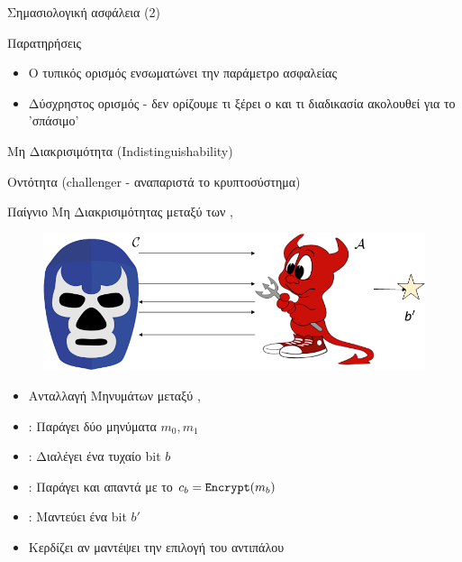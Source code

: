 \documentclass[handout]{beamer}
\begin{document}
\begin{frame}{Σημασιολογική ασφάλεια (2)}
\begin{block}{Παρατηρήσεις}
\begin{itemize}
\item Ο τυπικός ορισμός ενσωματώνει την παράμετρο ασφαλείας
\item Δύσχρηστος ορισμός - δεν ορίζουμε τι ξέρει ο \adv και τι διαδικασία  ακολουθεί για το 'σπάσιμο'
\end{itemize}
\end{block}
\end{frame}

\begin{frame}{Μη Διακρισιμότητα (Indistinguishability)}

Οντότητα  (challenger - αναπαριστά το κρυπτοσύστημα)

Παίγνιο Μη Διακρισιμότητας μεταξύ των \adv, \chal

\begin{figure} 
	\includegraphics[scale=0.3]{game.png}  
\end{figure}
 
\begin{itemize}
	\item Ανταλλαγή Μηνυμάτων μεταξύ \adv, \chal \pause
	\item \adv: Παράγει δύο μηνύματα $m_0, m_1$ \pause
	\item \chal: Διαλέγει ένα τυχαίο bit $b$ \pause
	\item \chal: Παράγει και απαντά με το $c_b = \mathtt{Encrypt}(m_b)$ \pause
	\item \adv: Μαντεύει ένα bit $b'$ \pause
	\item Κερδίζει αν μαντέψει την επιλογή του αντιπάλου
\end{itemize}	
 
\end{frame}
\end{document}
